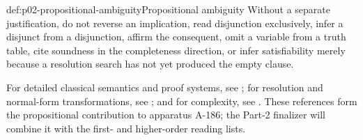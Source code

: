 \begin{hbwarning}{def:p02-propositional-ambiguity}{Propositional ambiguity}
Without a separate justification, do not reverse an implication, read
disjunction exclusively, infer a disjunct from a disjunction, affirm the
consequent, omit a variable from a truth table, cite soundness in the
completeness direction, or infer satisfiability merely because a resolution
search has not yet produced the empty clause.
\end{hbwarning}

For detailed classical semantics and proof systems, see
\cite{EbbinghausFlumThomas1994,OpenLogic2026,Kleene1952}; for resolution and
normal-form transformations, see
\cite{Robinson1965,BaazEglyLeitsch2001}; and for complexity, see
\cite{Cook1971,AroraBarak2009}.  These references form the propositional
contribution to apparatus A-186; the Part-2 finalizer will combine it with the
first- and higher-order reading lists.

